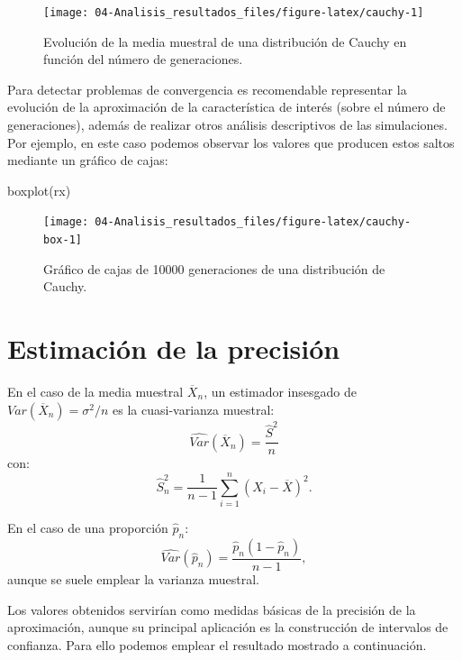 \documentclass[
]{book}
\newenvironment{Shaded}{\begin{snugshade}}{\end{snugshade}}
\newcommand{\FunctionTok}[1]{\textcolor[rgb]{0.00,0.00,0.00}{#1}}
\newcommand{\NormalTok}[1]{#1}
\theoremstyle{break}
\theoremstyle{definition}
\theoremstyle{definition}
\theoremstyle{definition}
\theoremstyle{definition}
\theoremstyle{remark}
\begin{document}
\begin{figure}[!htb]

{\centering \texttt{[image: 04-Analisis\_resultados\_files/figure-latex/cauchy-1]} 

}

\caption{Evolución de la media muestral de una distribución de Cauchy en función del número de generaciones.}\label{fig:cauchy}
\end{figure}

Para detectar problemas de convergencia es recomendable representar la evolución de la aproximación de la característica de interés (sobre el número de generaciones),
además de realizar otros análisis descriptivos de las simulaciones.
Por ejemplo, en este caso podemos observar los valores que producen estos saltos mediante un gráfico de cajas:

\begin{Shaded}
\begin{Highlighting}[]
\FunctionTok{boxplot}\NormalTok{(rx)}
\end{Highlighting}
\end{Shaded}

\begin{figure}[!htb]

{\centering \texttt{[image: 04-Analisis\_resultados\_files/figure-latex/cauchy-box-1]} 

}

\caption{Gráfico de cajas de 10000 generaciones de una distribución de Cauchy.}\label{fig:cauchy-box}
\end{figure}

\hypertarget{estimaciuxf3n-de-la-precisiuxf3n}{%
\section{Estimación de la precisión}\label{estimaciuxf3n-de-la-precisiuxf3n}}

En el caso de la media muestral \(\overline{X}_{n}\), un estimador
insesgado de \(Var\left( \overline{X}_{n}\right) =\sigma ^{2}/n\) es la cuasi-varianza muestral:
\[\widehat{Var}\left( \overline{X}_{n}\right) =\frac{\widehat{S}^{2}}{n}\]
con:
\[\widehat{S}_{n}^{2}=\dfrac{1}{n-1}\sum\limits_{i=1}^{n}\left( X_{i}-
\overline{X}\right) ^{2}.\]

En el caso de una proporción \(\hat{p}_{n}\):
\[\widehat{Var}\left( \hat{p}_{n}\right) 
=\frac{\hat{p}_{n}(1-\hat{p}_{n})}{n-1},\]
aunque se suele emplear la varianza muestral.

Los valores obtenidos servirían como medidas básicas de la precisión de la aproximación, aunque su principal aplicación es la construcción de intervalos de confianza.
Para ello podemos emplear el resultado mostrado a continuación.
\end{document}
